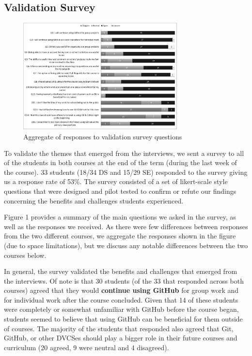 
\subsection{Validation Survey}
\begin{figure}[t]
\centering
\includegraphics[width=0.75\textwidth]{surveychart}
\vspace{-4pt}
\caption{Aggregate of responses to validation survey questions}
\vspace{-12pt}
\end{figure}

To validate the themes that emerged from the interviews, we sent a survey to all of the students in both courses at the end of the term (during the last week of the course). 33 students (18/34 DS and 15/29 SE) responded to the survey giving us a response rate of 53\%.  The survey consisted of a set of likert-scale style questions that were designed and pilot tested to confirm or refute our findings concerning the benefits and challenges students experienced.

Figure 1 provides a summary of the main questions we asked in the survey, as well as the responses we received.
As there were few differences between responses from the two different courses, we aggregate the responses shown in the figure (due to space limitations), but we discuss any notable differences between the two courses below.

In general, the survey validated the benefits and challenges that emerged from the interviews.
Of note is that 30 students (of the 33 that responded across both courses) agreed that they would \textbf{continue using GitHub} for group work and for individual work after the course concluded. Given that 14 of these students were completely or somewhat unfamiliar with GitHub before the course began, students seemed to believe that using GitHub can be beneficial for them outside of courses.
The majority of the students that responded also agreed that Git, GitHub, or other DVCSes should play a bigger role in their future courses and curriculum (20 agreed, 9 were neutral and 4 disagreed).

